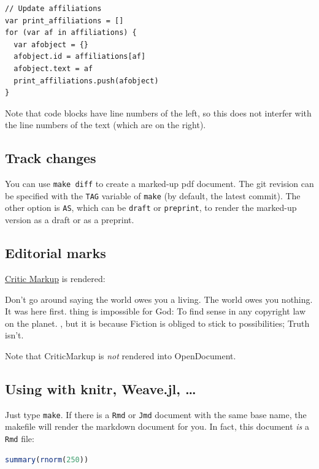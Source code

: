\documentclass[12pt]{article}
\begin{document}
\begin{lstlisting}
// Update affiliations
var print_affiliations = []
for (var af in affiliations) {
  var afobject = {}
  afobject.id = affiliations[af]
  afobject.text = af
  print_affiliations.push(afobject)
}
\end{lstlisting}

Note that code blocks have line numbers of the left, so this does not
interfer with the line numbers of the text (which are on the right).

\subsection{Track changes}\label{track-changes}

You can use \lstinline!make diff! to create a marked-up pdf document.
The git revision can be specified with the \lstinline!TAG! variable of
\lstinline!make! (by default, the latest commit). The other option is
\lstinline!AS!, which can be \lstinline!draft! or \lstinline!preprint!,
to render the marked-up version as a draft or as a preprint.

\subsection{Editorial marks}\label{editorial-marks}

\href{http://criticmarkup.com/}{Critic Markup} is rendered:

Don't go around saying the world owes you a
living. The world owes you nothing. It was here first.
 thing is impossible for God: To find
 sense in any copyright law on the planet.
, but it is because Fiction is obliged to stick to possibilities;
Truth isn't.

Note that CriticMarkup is \emph{not} rendered into OpenDocument.

\subsection{Using with knitr, Weave.jl,
\ldots{}}\label{using-with-knitr-weave.jl}

Just type \lstinline!make!. If there is a \lstinline!Rmd! or
\lstinline!Jmd! document with the same base name, the makefile will
render the markdown document for you. In fact, this document \emph{is} a
\lstinline!Rmd! file:

\begin{lstlisting}[language=R]
summary(rnorm(250))
\end{lstlisting}
\end{document}
